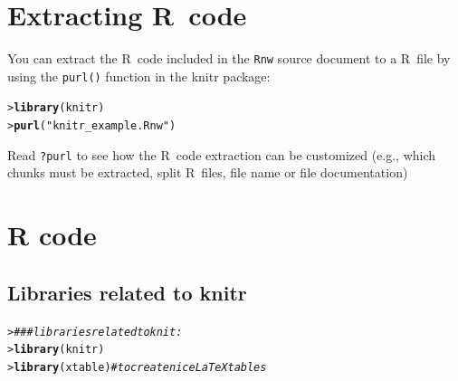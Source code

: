\documentclass[10pt,a4paper,twoside]{article}\usepackage[]{graphicx}\usepackage[]{xcolor}
\makeatletter
\newcommand{\hlsng}[1]{\textcolor[rgb]{0.192,0.494,0.8}{#1}}%
\newcommand{\hlcom}[1]{\textcolor[rgb]{0.678,0.584,0.686}{\textit{#1}}}%
\newcommand{\hldef}[1]{\textcolor[rgb]{0.345,0.345,0.345}{#1}}%
\newcommand{\hlkwd}[1]{\textcolor[rgb]{0.737,0.353,0.396}{\textbf{#1}}}%
\newenvironment{kframe}{%
 \def\at@end@of@kframe{}%
 \ifinner\ifhmode%
  \def\at@end@of@kframe{\end{minipage}}%
  \begin{minipage}{\columnwidth}%
 \fi\fi%
 \def\FrameCommand##1{\hskip\@totalleftmargin \hskip-\fboxsep
 \colorbox{shadecolor}{##1}\hskip-\fboxsep
     \hskip-\linewidth \hskip-\@totalleftmargin \hskip\columnwidth}%
 \MakeFramed {\advance\hsize-\width
   \@totalleftmargin\z@ \linewidth\hsize
   \@setminipage}}%
 {\par\unskip\endMakeFramed%
 \at@end@of@kframe}
\newenvironment{knitrout}{}{} %
\newcommand{\Robject}[1]{\texttt{#1}}
\newcommand{\Rpackage}[1]{\textsf{#1}}
\newcommand{\R}{\textsf{R}}
\newcommand{\Rfun}[1]{\texttt{#1\hspace{-0.15em}()}}
\newcommand{\Rcode}[1]{\texttt{#1}}
\makeatother
\begin{document}
\section{Extracting \R\ code}
\label{sec:r}
You can extract the \R\ code included in the \Robject{Rnw} source document to a \R\ file by using the \Rfun{purl} function in the \Rpackage{knitr} package:

\begin{knitrout}\footnotesize
{}\color{fgcolor}\begin{kframe}
\begin{alltt}
\hldef{> }\hlkwd{library}\hldef{(knitr)}
\hldef{> }\hlkwd{purl}\hldef{(}\hlsng{"knitr_example.Rnw"}\hldef{)}
\end{alltt}
\end{kframe}
\end{knitrout}

Read \Rcode{?purl} to see how the \R\ code extraction can be customized (e.g., which chunks must be extracted, split \R\ files, file name or file documentation)


\clearpage
{} %








\clearpage


\appendix
\section{R code}
\label{app:Rcode}



\subsection{Libraries related to \Rpackage{knitr}}
\label{app:libraries}
\begin{knitrout}\footnotesize
{}\color{fgcolor}\begin{kframe}
\begin{alltt}
\hldef{> }\hlcom{### libraries related to knit:}
\hldef{> }\hlkwd{library}\hldef{(knitr)}
\hldef{> }\hlkwd{library}\hldef{(xtable)}     \hlcom{# to create nice LaTeX tables}
\end{alltt}
\end{kframe}
\end{knitrout}
  
\end{document}
